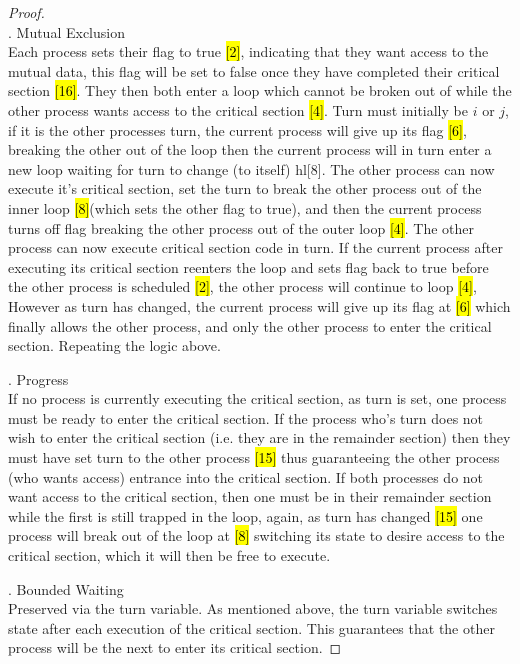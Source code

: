 \documentclass[12pt]{jhwhw}
\begin{document}
	\clearpage
	\begin{addmargin}[1em]{}
		\begin{proof}\ \\
			. Mutual Exclusion \\
			Each process sets their flag to true \hl{[2]}, indicating that they want access
			to the mutual data, this  flag will be set to false once they have
			completed their critical section \hl{[16]}.
			They then both enter a loop which cannot be broken out of while
			the other process wants access to the critical section \hl{[4]}.
			Turn must initially be $i$ or $j$, if it is the other processes turn,
			the current process will give up its flag \hl{[6]}, 
			breaking the other out of the loop then
			the current process will in turn enter a new loop waiting for turn to change
			(to itself) hl{[8]}.
			The other process can now execute it's critical section, set the turn to break
			the other process out of the inner loop \hl{[8]}(which sets the other flag to true), 
			and then the current process turns off flag breaking the other
			process out of the outer loop \hl{[4]}. 
			The other process can now execute critical section code in turn.
			If the current process after executing its critical section reenters the loop 
			and sets flag back to true before the other process is scheduled \hl{[2]}, the other
			process will continue to loop \hl{[4]}, 
			However as turn has changed, the current process will give up its flag at
			\hl{[6]} which finally allows the other process, and only the other process
			to enter the critical section. Repeating the logic above.

			. Progress \\
			If no process is currently executing the critical section, as turn is set,
			one process must be ready to enter the critical section. If the process who's turn
			does not wish to enter the critical section (i.e. they are in the remainder section)
			then they must have set turn to the other process \hl{[15]} thus guaranteeing 
			the other process (who wants access) entrance into the critical section.
			If both processes do not want access to the critical section, then one
			must be in their remainder section while the first is still trapped
			in the loop, again, as turn has changed \hl{[15]} one process will break
			out of the loop at \hl{[8]} switching its state to desire access to the critical
			section, which it will then be free to execute.

			. Bounded Waiting \\
			Preserved via the turn variable. As mentioned above, the turn variable
			switches state after each execution of the critical section. This guarantees
			that the other process will be the next to enter its critical section.
		\end{proof}
	\end{addmargin}
	\clearpage
\end{document}
